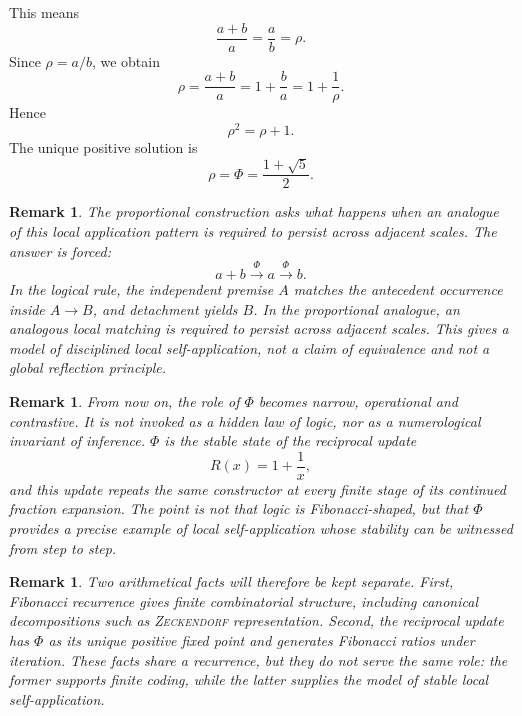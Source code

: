 \documentclass[letterpaper,10pt]{article}
\makeatletter
\theoremstyle{upright}
\theoremstyle{upright}
\newtheorem{remark}[theorem]{Remark}
\renewenvironment{proof}[1][Proof]{%
	\par\pushQED{\qed}%
	\normalfont
	\topsep6\p@\@plus6\p@\relax
	\trivlist
	\item[\hskip\labelsep\slshape #1\@addpunct{.}]%
}{%
	\popQED\endtrivlist\@endpefalse
}
\makeatother
\begin{document}
\begin{proof}
	This means
	\begin{equation}
		\frac{a+b}{a}=\frac{a}{b}=\rho.
	\end{equation}
	Since $\rho=a/b$, we obtain
	\begin{equation}
		\rho = \frac{a+b}{a} = 1+\frac{b}{a} = 1+\frac{1}{\rho}.
	\end{equation}
	Hence
	\begin{equation}
		\rho^2=\rho+1.
	\end{equation}
	The unique positive solution is
	\begin{equation}
		\rho=\Phi=\frac{1+\sqrt5}{2}.
	\end{equation}
\end{proof}

\begin{remark}
	The proportional construction asks what happens when an analogue of this local application pattern is required to persist across adjacent scales. The answer is forced:
	\begin{equation}
		a+b \xrightarrow{\Phi} a \xrightarrow{\Phi} b.
	\end{equation}
	In the logical rule, the independent premise $A$ matches the antecedent occurrence inside $A\to B$, and detachment yields $B$. In the proportional analogue, an analogous local matching is required to persist across adjacent scales. This gives a model of disciplined local self-application, not a claim of equivalence and not a global reflection principle.
\end{remark}

\begin{remark}
	From now on, the role of $\Phi$ becomes narrow, operational and contrastive. It is not invoked as a hidden law of logic, nor as a numerological invariant of inference. $\Phi$ is the stable state of the reciprocal update
	\begin{equation}
		R(x)=1+\frac{1}{x},
	\end{equation}
	and this update repeats the same constructor at every finite stage of its continued fraction expansion. The point is not that logic is Fibonacci-shaped, but that $\Phi$ provides a precise example of local self-application whose stability can be witnessed from step to step.
\end{remark}

\begin{remark}
	Two arithmetical facts will therefore be kept separate. First, Fibonacci recurrence gives finite combinatorial structure, including canonical decompositions such as \textsc{Zeckendorf} representation. Second, the reciprocal update has $\Phi$ as its unique positive fixed point and generates Fibonacci ratios under iteration. These facts share a recurrence, but they do not serve the same role: the former supports finite coding, while the latter supplies the model of stable local self-application.
\end{remark}
\end{document}
